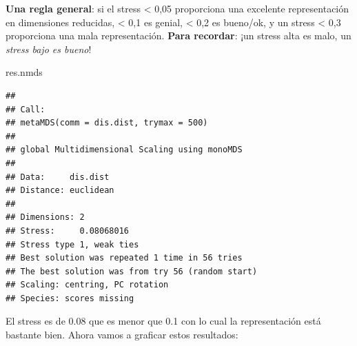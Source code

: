 \documentclass[
]{book}
\newenvironment{Shaded}{\begin{snugshade}}{\end{snugshade}}
\newcommand{\AttributeTok}[1]{\textcolor[rgb]{0.77,0.63,0.00}{#1}}
\newcommand{\ConstantTok}[1]{\textcolor[rgb]{0.00,0.00,0.00}{#1}}
\newcommand{\DecValTok}[1]{\textcolor[rgb]{0.00,0.00,0.81}{#1}}
\newcommand{\FloatTok}[1]{\textcolor[rgb]{0.00,0.00,0.81}{#1}}
\newcommand{\FunctionTok}[1]{\textcolor[rgb]{0.00,0.00,0.00}{#1}}
\newcommand{\NormalTok}[1]{#1}
\newcommand{\SpecialCharTok}[1]{\textcolor[rgb]{0.00,0.00,0.00}{#1}}
\newcommand{\StringTok}[1]{\textcolor[rgb]{0.31,0.60,0.02}{#1}}
\begin{document}
\textbf{Una regla general}: si el stress \textless{} 0,05 proporciona una excelente representación en dimensiones reducidas, \textless{} 0,1 es genial, \textless{} 0,2 es bueno/ok, y un stress \textless{} 0,3 proporciona una mala representación. \textbf{Para recordar}: ¡un stress alta es malo, un \emph{stress bajo es bueno}!

\begin{Shaded}
\begin{Highlighting}[]
\NormalTok{res.nmds}
\end{Highlighting}
\end{Shaded}

\begin{verbatim}
## 
## Call:
## metaMDS(comm = dis.dist, trymax = 500) 
## 
## global Multidimensional Scaling using monoMDS
## 
## Data:     dis.dist 
## Distance: euclidean 
## 
## Dimensions: 2 
## Stress:     0.08068016 
## Stress type 1, weak ties
## Best solution was repeated 1 time in 56 tries
## The best solution was from try 56 (random start)
## Scaling: centring, PC rotation 
## Species: scores missing
\end{verbatim}

El stress es de 0.08 que es menor que 0.1 con lo cual la representación está bastante bien. Ahora vamos a graficar estos resultados:

\begin{Shaded}
\end{Shaded}
\end{document}
